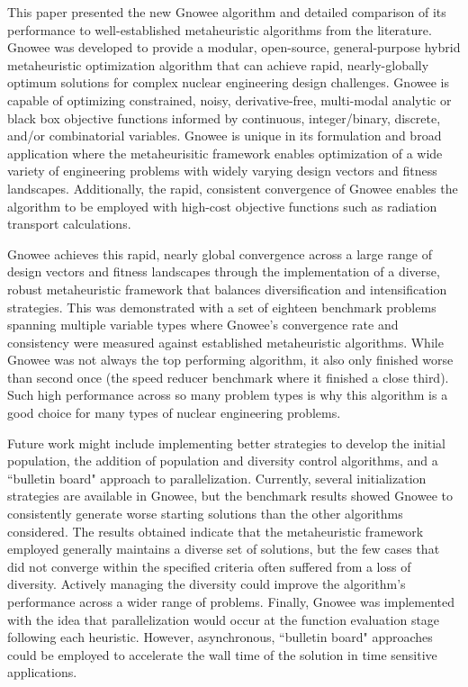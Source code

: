 \documentclass{article}                                                                           %
\begin{document}
This paper presented the new Gnowee algorithm and detailed comparison of its performance to well-established metaheuristic algorithms from the literature.
Gnowee was developed to provide a modular, open-source, general-purpose hybrid metaheuristic optimization algorithm that can achieve rapid, nearly-globally optimum solutions for complex nuclear engineering design challenges.
Gnowee is capable of optimizing constrained, noisy, derivative-free, multi-modal analytic or black box objective functions informed by continuous, integer/binary, discrete, and/or combinatorial variables.
Gnowee is unique in its formulation and broad application where the metaheurisitic framework enables optimization of a wide variety of engineering problems with widely varying design vectors and fitness landscapes.
Additionally, the rapid, consistent convergence of Gnowee enables the algorithm to be employed with high-cost objective functions such as radiation transport calculations.

Gnowee achieves this rapid, nearly global convergence across a large range of design vectors and fitness landscapes through the implementation of a diverse, robust metaheuristic framework that balances diversification and intensification strategies.
This was demonstrated with a set of eighteen benchmark problems spanning multiple variable types where Gnowee's convergence rate and consistency were measured against established metaheuristic algorithms.
While Gnowee was not always the top performing algorithm, it also only finished worse than second once (the speed reducer benchmark where it finished a close third).
Such high performance across so many problem types is why this algorithm is a good choice for many types of nuclear engineering problems. 

Future work might include implementing better strategies to develop the initial population, the addition of population and diversity control algorithms, and a ``bulletin board" approach to parallelization. 
Currently, several initialization strategies are available in Gnowee, but the benchmark results showed Gnowee to consistently generate worse starting solutions than the other algorithms considered.
The results obtained indicate that the metaheuristic framework employed generally maintains a diverse set of solutions, but the few cases that did not converge within the specified criteria often suffered from a loss of diversity.
Actively managing the diversity could improve the algorithm's performance across a wider range of problems.
Finally, Gnowee was implemented with the idea that parallelization would occur at the function evaluation stage following each heuristic.
However, asynchronous, ``bulletin board" approaches could be employed to accelerate the wall time of the solution in time sensitive applications.
\end{document}

